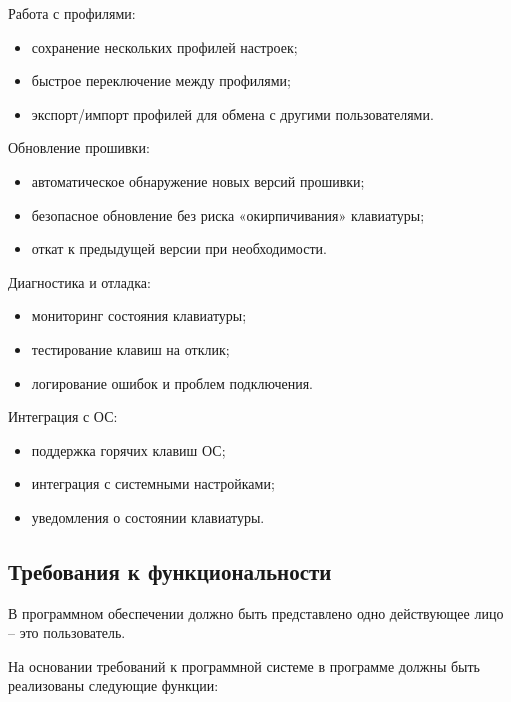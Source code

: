 Работа с профилями:

\begin{itemize}
\item сохранение нескольких профилей настроек;
\item быстрое переключение между профилями;
\item экспорт/импорт профилей для обмена с другими пользователями.
\end{itemize}

Обновление прошивки:

\begin{itemize}
\item автоматическое обнаружение новых версий прошивки;
\item безопасное обновление без риска «окирпичивания» клавиатуры;
\item откат к предыдущей версии при необходимости.
\end{itemize}

Диагностика и отладка:

\begin{itemize}
\item мониторинг состояния клавиатуры;
\item тестирование клавиш на отклик;
\item логирование ошибок и проблем подключения.
\end{itemize}

Интеграция с ОС:

\begin{itemize}
\item поддержка горячих клавиш ОС;
\item интеграция с системными настройками;
\item уведомления о состоянии клавиатуры.
\end{itemize}

\subsection{Требования к функциональности}

В программном обеспечении должно быть представлено одно действующее лицо -- это пользователь.

На основании требований к программной системе в программе должны быть реализованы следующие функции:

